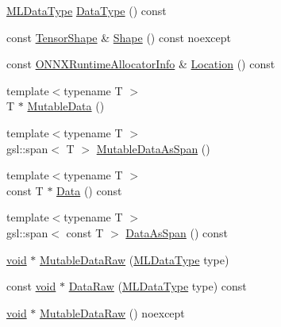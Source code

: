 \begin{DoxyCompactItemize}
\item 
\mbox{\hyperlink{namespaceonnxruntime_ad77d0a6e838ec7da5dc35fed5ee66b49}{M\+L\+Data\+Type}} \mbox{\hyperlink{classonnxruntime_1_1Tensor_a1e4c9fc0c4ad68ca450e2e7d4aec0c43}{Data\+Type}} () const
\item 
const \mbox{\hyperlink{classonnxruntime_1_1TensorShape}{Tensor\+Shape}} \& \mbox{\hyperlink{classonnxruntime_1_1Tensor_a35f659dde537304b2492b7c0bec8a7b4}{Shape}} () const noexcept
\item 
const \mbox{\hyperlink{structONNXRuntimeAllocatorInfo}{O\+N\+N\+X\+Runtime\+Allocator\+Info}} \& \mbox{\hyperlink{classonnxruntime_1_1Tensor_a6135bef01259279436c85e7c698bad8b}{Location}} () const
\item 
{\footnotesize template$<$typename T $>$ }\\T $\ast$ \mbox{\hyperlink{classonnxruntime_1_1Tensor_ac0094e931dedd1e48956a28349f964a1}{Mutable\+Data}} ()
\item 
{\footnotesize template$<$typename T $>$ }\\gsl\+::span$<$ T $>$ \mbox{\hyperlink{classonnxruntime_1_1Tensor_aefab328a8a7d23384d505dd52f5483a0}{Mutable\+Data\+As\+Span}} ()
\item 
{\footnotesize template$<$typename T $>$ }\\const T $\ast$ \mbox{\hyperlink{classonnxruntime_1_1Tensor_a76c100a2c7ae207975364f569fe69edb}{Data}} () const
\item 
{\footnotesize template$<$typename T $>$ }\\gsl\+::span$<$ const T $>$ \mbox{\hyperlink{classonnxruntime_1_1Tensor_a503b297f9a6945f66c957f9fe9bc60b8}{Data\+As\+Span}} () const
\item 
\mbox{\hyperlink{mlasi_8h_a88f941d423cb2a819b70a1358982b1a6}{void}} $\ast$ \mbox{\hyperlink{classonnxruntime_1_1Tensor_afa53b6e1fd63969007a84e5026073efe}{Mutable\+Data\+Raw}} (\mbox{\hyperlink{namespaceonnxruntime_ad77d0a6e838ec7da5dc35fed5ee66b49}{M\+L\+Data\+Type}} type)
\item 
const \mbox{\hyperlink{mlasi_8h_a88f941d423cb2a819b70a1358982b1a6}{void}} $\ast$ \mbox{\hyperlink{classonnxruntime_1_1Tensor_a347043b45cb4624679996650de575303}{Data\+Raw}} (\mbox{\hyperlink{namespaceonnxruntime_ad77d0a6e838ec7da5dc35fed5ee66b49}{M\+L\+Data\+Type}} type) const
\item 
\mbox{\hyperlink{mlasi_8h_a88f941d423cb2a819b70a1358982b1a6}{void}} $\ast$ \mbox{\hyperlink{classonnxruntime_1_1Tensor_a64e52a47859e86aef3fa540f26ebee22}{Mutable\+Data\+Raw}} () noexcept
\item 

\end{DoxyCompactItemize}
